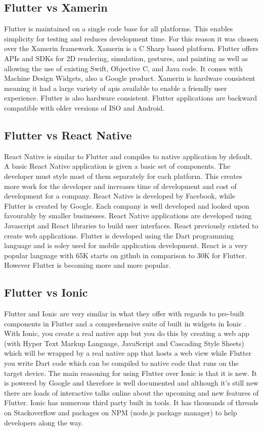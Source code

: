 \subsection{Flutter vs Xamerin}
Flutter is maintained on a single code base for all platforms. This enables simplicity for testing and reduces development time. For this reason it was chosen over the Xamerin framework. Xamerin is a C Sharp based platform. Flutter offers APIs and SDKs for 2D rendering, simulation, gestures, and painting as well as allowing the use of existing Swift, Objective C, and Java code. It comes with Machine Design Widgets, also a Google product. \cite{flutterVsXamarin}Xamerin is hardware consistent meaning it had a large variety of apis available to enable a friendly user experience. Flutter is also hardware consistent. Flutter applications are backward compatible with older versions of ISO and Android.\cite{flutterVsReactVsXamarin}

\subsection{Flutter vs React Native}
React Native is similar to Flutter and compiles to native application by default. A basic React Native application is given a basic set of components. The developer must style most of them separately for each platform. This creates more work for the developer and increases time of development and cost of development for a company. React Native is developed by Facebook, while Flutter is created by Google. Each company is well developed and looked upon favourably by smaller businesses. React Native applications are developed using Javascript and React libraries to build user interfaces. React previously existed to create web applications. Flutter is developed using the Dart programming language and is soley used for mobile application development. React is a very popular language with 65K starts on github in comparison to 30K for Flutter. However Flutter is becoming more and more popular. \cite{FlutterVS_2018} \cite{ReactVsFlutterVsIonic}

\subsection{Flutter vs Ionic}
Flutter and Ionic are very similar in what they offer with regards to pre-built components in Flutter and a comprehensive suite of built in widgets in Ionic \cite{ReactVsFlutterVsIonic}. With Ionic, you create a real native app but you do this by creating a web app (with Hyper Text Markup Language, JavaScript and Cascading Style Sheets) which will be wrapped by a real native app that hosts a web view while Flutter you write Dart code which can be compiled to native code that runs on the target device. The main reasoning for using Flutter over Ionic is that it is new. It is powered by Google and therefore is well documented and although it’s still new there are loads of interactive talks online about the upcoming and new features of Flutter. Ionic has numerous third party built in tools. It has thousands of threads on Stackoverflow and packages on NPM (node.js package manager) to help developers along the way.\cite{FlutterVS_2018}

